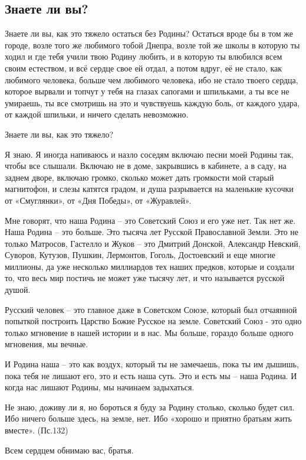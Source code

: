  
 
 
 
 
\subsection{Знаете ли вы?}

Знаете ли вы, как это тяжело остаться без Родины? Остаться вроде бы в том же
городе, возле того же любимого тобой Днепра, возле той же школы в которую ты
ходил и где тебя учили твою Родину любить, и в которую ты влюбился всем своим
естеством, и всё сердце свое ей отдал, а потом вдруг, её не стало, как любимого
человека, больше чем любимого человека, ибо не стало твоего сердца, которое
вырвали и топчут у тебя на глазах сапогами и шпильками, а ты все не умираешь,
ты все смотришь на это и чувствуешь каждую боль, от каждого удара, от каждой
шпильки, и ничего сделать невозможно. 

Знаете ли вы, как это тяжело?

Я знаю. Я иногда напиваюсь и назло соседям включаю песни моей Родины так, чтобы
все слышали. Включаю не в доме, закрывшись в кабинете, а в саду, на заднем
дворе, включаю громко, сколько может дать громкости мой старый магнитофон, и
слезы катятся градом, и душа разрывается на маленькие кусочки от «Смуглянки»,
от «Дня Победы», от «Журавлей». 

Мне говорят, что наша Родина – это Советский Союз и его уже нет. Так нет же.
Наша Родина – это больше. Это тысяча лет Русской Православной Земли. Это не
только Матросов, Гастелло и Жуков – это Дмитрий Донской, Александр Невский,
Суворов, Кутузов, Пушкин, Лермонтов, Гоголь, Достоевский и еще многие миллионы,
да уже несколько миллиардов тех наших предков, которые и создали то, что весь
мир постичь не может уже тысячу лет, и что называется русской душой. 

Русский человек – это главное даже в Советском Союзе, который был отчаянной
попыткой построить Царство Божие Русское на земле. Советский Союз - это одно
только мгновение в нашей истории и в нас. Мы больше, гораздо больше одного
мгновения, мы вечные. 

И Родина наша – это как воздух, который ты не замечаешь, пока ты им дышишь,
пока тебя не лишают его, это и есть наша суть. Это и есть мы – наша Родина. И
когда нас лишают Родины, мы начинаем задыхаться.

Не знаю, доживу ли я, но бороться я буду за Родину столько, сколько будет сил.
Ибо ничего больше здесь, на земле, нет. Ибо «хорошо и приятно братьям жить
вместе». (Пс.132)

Всем сердцем обнимаю вас, братья.


